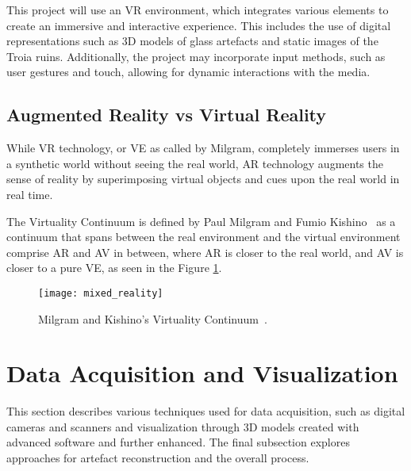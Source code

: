 This project will use an \gls{VR} environment, which integrates various elements to create an immersive and interactive experience.
This includes the use of digital representations such as \gls{3D} models of glass artefacts and static images of the Troia ruins.
Additionally, the project may incorporate input methods, such as user gestures and touch, allowing for dynamic interactions with the media. 


\subsection{Augmented Reality vs Virtual Reality}
\label{sec:mix_reality}

While \gls{VR} technology, or \gls{VE} as called by Milgram, completely immerses users in a synthetic world
without seeing the real world, \gls{AR} technology augments the sense of reality by superimposing virtual objects and cues upon the real world in real time. 

The Virtuality Continuum is defined by Paul Milgram and Fumio Kishino~\cite{milgram1994taxonomy} as a continuum that spans between the real environment
and the virtual environment comprise \gls{AR} and \gls{AV}
in between, where \gls{AR} is closer to the real world, and \gls{AV} is closer to a pure \gls{VE}, as seen in the Figure \ref{fig:mixed_reality}.

\begin{figure}[htbp]
    \centering
    \texttt{[image: mixed\_reality]}
    \caption{Milgram and Kishino’s Virtuality Continuum~\cite{milgram1994taxonomy}.}
    \label{fig:mixed_reality} 
\end{figure} 
\FloatBarrier


\section{ Data Acquisition and Visualization}
\label{sec:data}

This section describes various techniques used for data acquisition, such as digital cameras and scanners and visualization through 3D models created with advanced software and further enhanced. 
The final subsection explores approaches for artefact reconstruction and the overall process.

